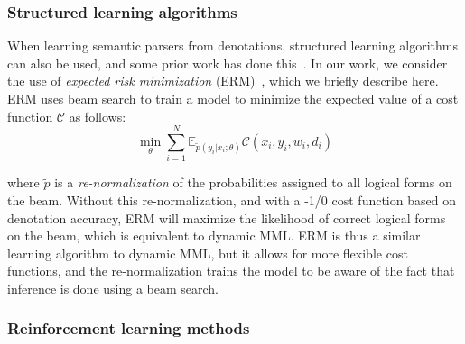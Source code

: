 \subsubsection{Structured learning algorithms}\label{sec:erm}
When learning semantic parsers from denotations, structured learning algorithms
can also be used, and some prior work has done
this~\cite{IyyerSQA2016,guu2017bridging}.  In our work, we consider the use of
\emph{expected risk minimization} (ERM)~\cite{smith2006minimum}, which we
briefly describe here.  ERM uses beam search to train a model to minimize the
expected value of a cost function $\mathcal{C}$ as follows: \begin{equation}
\min_{\theta} \sum_{i=1}^{N} \mathbb{E}_{\tilde{p}(y_i|x_i;
\theta)}\mathcal{C}(x_i, y_i, w_i, d_i) \label{eq:erm} \end{equation}

\noindent where $\tilde{p}$ is a \emph{re-normalization} of the probabilities
assigned to all logical forms on the beam.  Without this re-normalization, and
with a -1/0 cost function based on denotation accuracy, ERM will maximize the
likelihood of correct logical forms on the beam, which is equivalent to dynamic
MML\@.  ERM is thus a similar learning algorithm to dynamic MML, but it allows
for more flexible cost functions, and the re-normalization trains the model to
be aware of the fact that inference is done using a beam search.

\subsubsection{Reinforcement learning methods}
